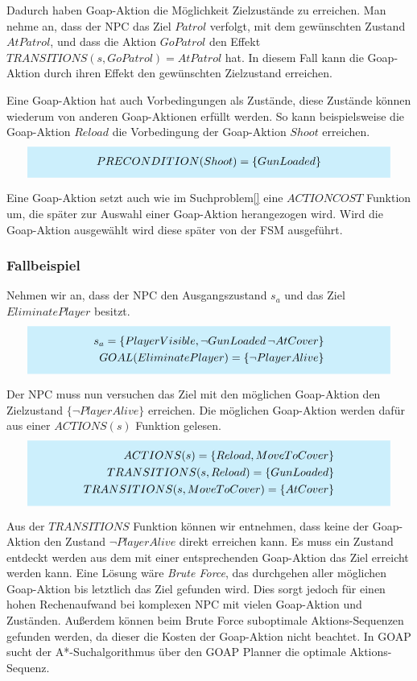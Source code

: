 Dadurch haben Goap-Aktion die Möglichkeit Zielzustände zu erreichen. Man nehme an, dass der NPC das Ziel $Patrol$ verfolgt, mit dem gewünschten Zustand $AtPatrol$, und dass die Aktion $GoPatrol$ den Effekt $TRANSITIONS(s, GoPatrol) = {AtPatrol}$ hat. In diesem Fall kann die Goap-Aktion durch ihren Effekt den gewünschten Zielzustand erreichen.

Eine Goap-Aktion hat auch Vorbedingungen als Zustände, diese Zustände können wiederum von anderen Goap-Aktionen erfüllt werden. So kann beispielsweise die Goap-Aktion $Reload$ die Vorbedingung der Goap-Aktion $Shoot$ erreichen.
\[
	\highlightbox{0.9\textwidth}{$
		\begin{align*}
			PRECONDITION(Shoot) = \{GunLoaded\}
		\end{align*}
	$}
\]

Eine Goap-Aktion setzt auch wie im Suchproblem\ref{} eine $ACTIONCOST$ Funktion um, die später zur Auswahl einer Goap-Aktion herangezogen wird. Wird die Goap-Aktion ausgewählt wird diese später von der FSM ausgeführt.


\subsubsection{Fallbeispiel}
\label{chap:goap action beispiel}

Nehmen wir an, dass der NPC den Ausgangszustand $s_a$ und das Ziel $EliminatePlayer$ besitzt.
\[
	\highlightbox{0.9\textwidth}{$
		\begin{align*}
			s_a = \{PlayerVisible, \lnot GunLoaded\, \lnot AtCover\} \\
			GOAL(EliminatePlayer) = \{\lnot PlayerAlive\}
		\end{align*}
	$}
\]

Der NPC muss nun versuchen das Ziel mit den möglichen Goap-Aktion den Zielzustand $\{\lnot PlayerAlive\}$ erreichen. Die möglichen Goap-Aktion werden dafür aus einer $ACTIONS(s)$ Funktion gelesen.
\[
	\highlightbox{0.9\textwidth}{$
		\begin{align*}
			ACTIONS(s) = \{Reload, MoveToCover\} \\
			TRANSITIONS(s,Reload) = \{GunLoaded\} \\
			TRANSITIONS(s,MoveToCover) = \{AtCover\}
		\end{align*}
	$}
\]

Aus der $TRANSITIONS$ Funktion können wir entnehmen, dass keine der Goap-Aktion den Zustand $\lnot PlayerAlive$ direkt erreichen kann. Es muss ein Zustand entdeckt werden aus dem mit einer entsprechenden Goap-Aktion das Ziel erreicht werden kann. Eine Lösung wäre \textit{Brute Force}, das durchgehen aller möglichen Goap-Aktion bis letztlich das Ziel gefunden wird. Dies sorgt jedoch für einen hohen Rechenaufwand bei komplexen NPC mit vielen Goap-Aktion und Zuständen. Außerdem können beim Brute Force suboptimale Aktions-Sequenzen gefunden werden, da dieser die Kosten der Goap-Aktion nicht beachtet. In GOAP sucht der A*-Suchalgorithmus über den GOAP Planner die optimale Aktions-Sequenz.


